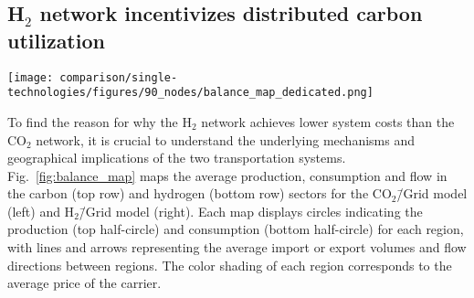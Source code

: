 \documentclass[twocolumn]{article}
\newcommand{\COtwo}{CO$_2$}
\newcommand{\Htwo}{H$_2$}
\newcommand{\modCO}{CO$_2$\=/Grid model}
\newcommand{\modH}{H$_2$\=/Grid model}
\newcommand{\carbon}{CO$_2$}
\newcommand{\hydrogen}{H$_2$}
\newcommand{\carbonmodel}{CO$_2$\=/Grid model}
\newcommand{\hydrogenmodel}{H$_2$\=/Grid model}
\begin{document}



\subsection*{\Htwo{} network incentivizes distributed carbon utilization}\label{subsec:H2}

\begin{figure*}[ht!]
    \centering
    \texttt{[image: comparison/single-technologies/figures/90\_nodes/balance\_map\_dedicated.png]}
    \caption{Optimal operation, flows and prices of the carbon (top line) and hydrogen (bottom line) sectors for the \carbonmodel{} (left) and the \hydrogenmodel{} (right) in the net zero scenario. For each region, upper semicircles show the average production per technology, lower semicircles the consumption, and colors the average marginal prices. Lines and arrows show the interregional transportation. Carbon sequestration offshore are drawn as full circles. \carbon{} and \hydrogen{} transport goes from low price to high price areas to supply CU and, in the case of \carbonmodel{}, CS.
    }
    \label{fig:balance_map}
\end{figure*}

To find the reason for why the \Htwo{} network achieves lower system costs than the \COtwo{} network, it is crucial to understand the underlying mechanisms and geographical implications of the two transportation systems. Fig.~\ref{fig:balance_map} maps the average production, consumption and flow in the carbon (top row) and hydrogen (bottom row) sectors for the \modCO{} (left) and \modH{} (right). Each map displays circles indicating the production (top half-circle) and consumption (bottom half-circle) for each region, with lines and arrows representing the average import or export volumes and flow directions between regions. The color shading of each region corresponds to the average price of the carrier.
\end{document}
